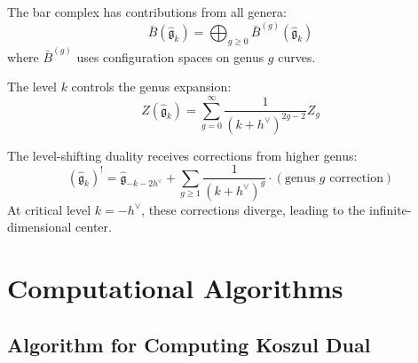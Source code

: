\begin{principle}
The bar complex has contributions from all genera:
\begin{equation}
\bar{B}(\widehat{\mathfrak{g}}_k) = \bigoplus_{g \geq 0} \bar{B}^{(g)}(\widehat{\mathfrak{g}}_k)
\end{equation}
where $\bar{B}^{(g)}$ uses configuration spaces on genus $g$ curves.

The level $k$ controls the genus expansion:
\begin{equation}
Z(\widehat{\mathfrak{g}}_k) = \sum_{g=0}^\infty \frac{1}{(k+h^\vee)^{2g-2}} Z_g
\end{equation}
\end{principle}

\begin{theorem}
The level-shifting duality receives corrections from higher genus:
\begin{equation}
(\widehat{\mathfrak{g}}_k)^! = \widehat{\mathfrak{g}}_{-k-2h^\vee} + \sum_{g \geq 1} \frac{1}{(k+h^\vee)^g} \cdot (\text{genus } g \text{ correction})
\end{equation}
At critical level $k = -h^\vee$, these corrections diverge, leading to the infinite-dimensional center.
\end{theorem}

\section{Computational Algorithms}

\subsection{Algorithm for Computing Koszul Dual}

